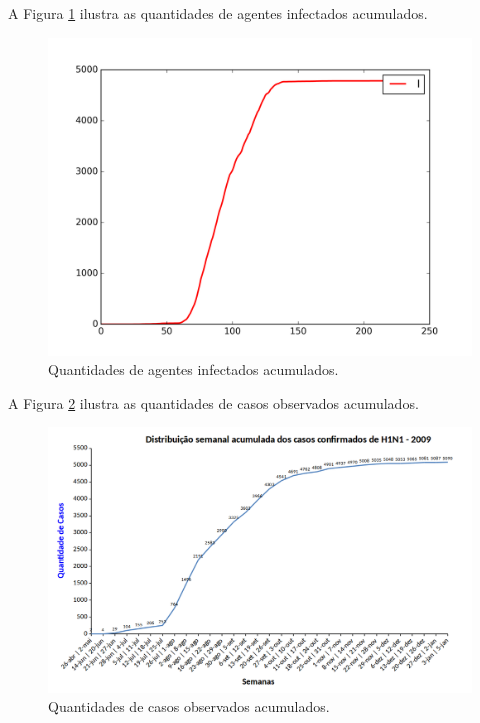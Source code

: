 A Figura \ref{fig:Quantidades_Agentes_Infectados_Acumulado_0002} ilustra as quantidades de agentes infectados acumulados.

\begin{figure}[H]
  \centering
  \includegraphics[width=1.0\textwidth]{Figuras/Resultados/0002/Saidas_GPU_BIT/MonteCarlo_0/Quantidades_Novo_Total_Acumulado_Total.png}
  \caption{Quantidades de agentes infectados acumulados.}
  \label{fig:Quantidades_Agentes_Infectados_Acumulado_0002}
\end{figure}

A Figura \ref{fig:Casos_Observados_Acumulados_0002} ilustra as quantidades de casos observados acumulados.

\begin{figure}[H]
  \centering
  \includegraphics[width=1.0\textwidth]{Figuras/Resultados/Observado/Casos_Observados_Acumulados.png}
  \caption{Quantidades de casos observados acumulados.}
  \label{fig:Casos_Observados_Acumulados_0002}
\end{figure}

